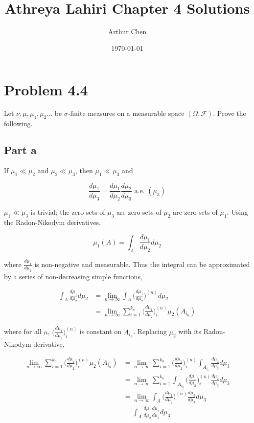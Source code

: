 \documentclass{article}
\author{Arthur Chen}
\title{Athreya Lahiri Chapter 4 Solutions}
\date{\today}
\newcommand{\F}{\mathcal{F}}
\begin{document}
\maketitle

\section*{Problem 4.4}

Let $\nu, \mu, \mu_1, \mu_2 \hdots$ be $\sigma$-finite measures on a measurable space $(\Omega, \F)$. Prove the following.

\subsection*{Part a}

If $\mu_1 \ll \mu_2$ and $\mu_2 \ll \mu_3$, then $\mu_1 \ll \mu_3$ and

\[
\frac{d\mu_1}{d\mu_3} = \frac{d\mu_1}{d\mu_2}\frac{d\mu_2}{d\mu_3} \text{ a.e. } (\mu_3)
\]

$\mu_1 \ll \mu_3$ is trivial; the zero sets of $\mu_3$ are zero sets of $\mu_2$ are zero sets of $\mu_1$. Using the Radon-Nikodym derivatives,

\[
\mu_1(A) = \int_A \frac{d\mu_1}{d\mu_2} d\mu_2
\]

where $\frac{d\mu_1}{d\mu_2}$ is non-negative and measurable. Thus the integral can be approximated by a series of non-decreasing simple functions,

\begin{align*}
\int_A \frac{d\mu_1}{d\mu_2} d\mu_2 &= \lim_{n\rightarrow \infty} \int_A \biggl( \frac{d\mu_1}{d\mu_2} \biggr)^{(n)}d\mu_2 \\
&= \lim_{n\rightarrow \infty} \sum_{i=1}^{k_n} \biggl( \frac{d\mu_1}{d\mu_2}\biggr)^{(n)}_i \mu_2(A_{i_n})
\end{align*}

where for all $n$, $\biggl( \frac{d\mu_1}{d\mu_2}\biggr)^{(n)}_i$ is constant on $A_{i_n}$. Replacing $\mu_2$ with its Radon-Nikodym derivative,

\begin{align*}
\lim_{n\rightarrow \infty} \sum_{i=1}^{k_n} \biggl( \frac{d\mu_1}{d\mu_2}\biggr)^{(n)}_i \mu_2(A_{i_n}) &= 
\lim_{n\rightarrow \infty} \sum_{i=1}^{k_n} \biggl( \frac{d\mu_1}{d\mu_2}\biggr)^{(n)}_i \int_{A_{i_n}} \frac{d\mu_2}{d\mu_3} d\mu_3 \\
&= \lim_{n\rightarrow \infty} \sum_{i=1}^{k_n} \int_{A_{i_n}} \biggl( \frac{d\mu_1}{d\mu_2}\biggr)^{(n)}_i \frac{d\mu_2}{d\mu_3} d\mu_3 \\
&= \lim_{n\rightarrow \infty} \int_A \biggl( \frac{d\mu_1}{d\mu_2}\biggr)^{(n)} \frac{d\mu_2}{d\mu_3} d\mu_3 \\
&= \int_A \frac{d\mu_1}{d\mu_2} \frac{d\mu_2}{d\mu_3} d\mu_3
\end{align*}
\end{document}
